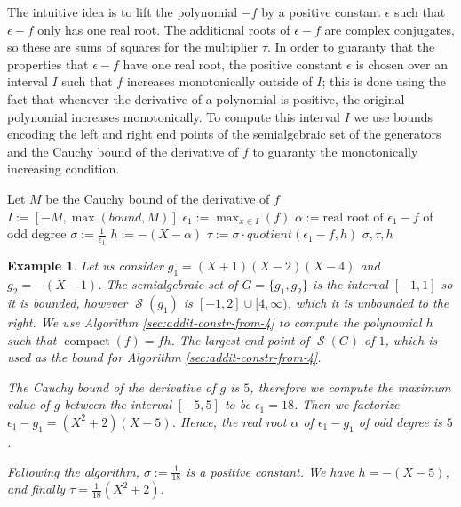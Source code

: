 \documentclass[preprint,12pt,authoryear]{elsarticle}
\newtheorem{example}[theorem]{Example}
\newenvironment{example1}
  {\begin{example}\rm}
  {\end{example}}
\newcommand{\aX}{\mathbb{A}[X]}
\DeclareMathOperator{\semialgebraic}{\mathcal{S}}
\DeclareMathOperator{\compact}{compact}
\begin{document}
The intuitive idea is to lift the polynomial $-f$ by a positive constant
$\epsilon$ such that $\epsilon - f$ only has one real root. The additional roots
of $\epsilon - f$ are complex conjugates, so these are sums of squares for the
multiplier $\tau$. In order to guaranty that the properties that $\epsilon - f$ have
one real root, the positive constant $\epsilon$ is chosen over an interval $I$
such that $f$ increases monotonically outside of $I$; this is done using the
fact that whenever the derivative of a polynomial is positive, the original
polynomial increases monotonically. To compute this interval $I$ we use
bounds encoding the left and right end points of the semialgebraic set
of the generators and the Cauchy bound \cite[Lemma 10.2, page
354]{10.5555/1197095} of the derivative of $f$ to guaranty the
monotonically increasing condition.

\begin{algorithm}
  \caption{Computing auxiliary polynomial $h$ when $\semialgebraic(f)$ is
    unbounded to the right}
  \label{sec:addit-constr-from-4}
  \kwInput{$f \in \aX, bound \in \mathbb{A}$}
  \kwOutput{$\sigma \in \mathbb{A}^{+}$ and $\tau, h \in \aX$}
  \kwEnsures{$1 = \sigma f + \tau h$, $\sigma, \tau \in \sum{\aX}^2$}  
  Let $M$ be the Cauchy bound of the derivative of $f$\;
  $I := [-M, \max(bound, M)]$\;
  $\epsilon_1 := \max_{x \in I}(f)$\;
  $\alpha := \text{real root of } \epsilon_1 - f$ of odd degree\;
  $\sigma := \frac{1}{\epsilon_1}$\;
  $h := -(X - \alpha)$\;
  $\tau := \sigma \cdot quotient(\epsilon_1 - f, h)$\;
  \Return $\sigma, \tau, h$\;   
\end{algorithm}

\begin{example1}
  \th\label{sec:addit-constr-from-2} Let us consider
  $g_1 = (X + 1)(X - 2)(X - 4)$ and $g_2 = -(X - 1)$. The semialgebraic set of
  $G = \{g_1, g_2\}$ is the interval $[-1, 1]$ so it is bounded, however
  $\semialgebraic(g_1)$ is $[-1, 2] \cup [4, \infty)$, which it is unbounded to
  the right. We use Algorithm \ref{sec:addit-constr-from-4} to compute the
  polynomial $h$ such that $\compact(f) = fh$. The largest end point of
  $\semialgebraic(G)$ of $1$, which is used as the bound for Algorithm
  \ref{sec:addit-constr-from-4}.

  The Cauchy bound of the derivative of $g$ is $5$, therefore we compute the maximum
  value of $g$ between the interval $[-5, 5]$ to be $\epsilon_1 = 18$. Then we
  factorize $\epsilon_1 - g_1 = (X^{2} + 2)(X - 5)$. Hence, the real root
  $\alpha$ of $\epsilon_1 - g_1$ of odd degree is $5$.

  Following the algorithm, $\sigma := \frac{1}{18}$ is a positive
  constant. We have $h = -(X - 5)$, and finally $\tau
  = \frac{1}{18} (X^{2} + 2)$.
\end{example1}
\end{document}
